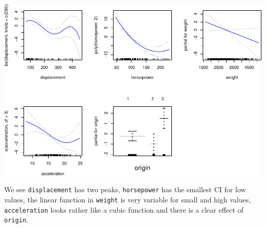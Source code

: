 \documentclass[
]{article}
\begin{document}
\includegraphics{RecEx7-sol_files/figure-latex/unnamed-chunk-7-1.pdf}

We see \texttt{displacement} has two peaks, \texttt{horsepower} has the
smallest CI for low values, the linear function in \texttt{weight} is
very variable for small and high values, \texttt{acceleration} looks
rather like a cubic function and there is a clear effect of
\texttt{origin}.
\end{document}
